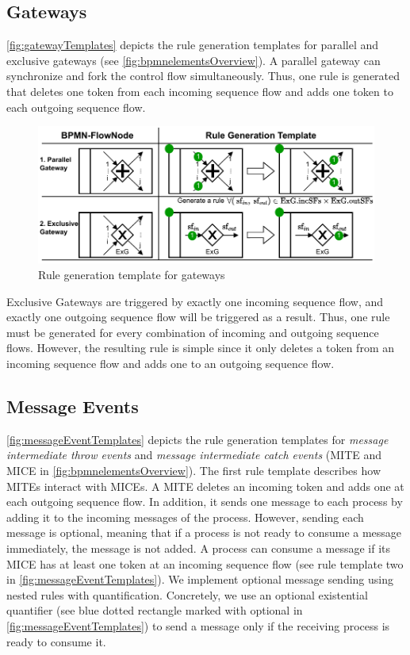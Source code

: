 \documentclass{lmcs} %
\theoremstyle{plain}\newtheorem{satz}[thm]{Satz} %
\begin{document}
\subsection{Gateways}
\autoref{fig:gatewayTemplates} depicts the rule generation templates for parallel and exclusive gateways (see \autoref{fig:bpmnelementsOverview}).
A parallel gateway can synchronize and fork the control flow simultaneously.
Thus, one rule is generated that deletes one token from each incoming sequence flow and adds one token to each outgoing sequence flow.

\begin{figure}[ht]
    \centering
    \includegraphics[width=1\textwidth]{images/gateways_template.pdf}
    \caption{Rule generation template for gateways}
    \label{fig:gatewayTemplates}
\end{figure}

Exclusive Gateways are triggered by exactly one incoming sequence flow, and exactly one outgoing sequence flow will be triggered as a result.
Thus, one rule must be generated for every combination of incoming and outgoing sequence flows.
However, the resulting rule is simple since it only deletes a token from an incoming sequence flow and adds one to an outgoing sequence flow.

\subsection{Message Events}
\autoref{fig:messageEventTemplates} depicts the rule generation templates for \textit{message intermediate throw events} and \textit{message intermediate catch events} (\textsf{MITE} and \textsf{MICE} in \autoref{fig:bpmnelementsOverview}).
The first rule template describes how MITEs interact with MICEs.
A MITE deletes an incoming token and adds one at each outgoing sequence flow.
In addition, it sends one message to each process by adding it to the incoming messages of the process.
However, sending each message is optional, meaning that if a process is not ready to consume a message immediately, the message is not added.
A process can consume a message if its MICE has at least one token at an incoming sequence flow (see rule template two in \autoref{fig:messageEventTemplates}).
We implement optional message sending using nested rules with quantification.
Concretely, we use an optional existential quantifier \cite{rensinkNestedQuantificationGraph2006} (see blue dotted rectangle marked with optional in \autoref{fig:messageEventTemplates}) to send a message only if the receiving process is ready to consume it.
\end{document}
